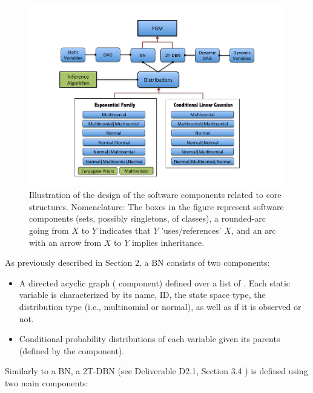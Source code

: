 \begin{figure}[htbp]
\begin{center}
\includegraphics[width=\linewidth]{./figures/ToolboxBasicStructures}
\caption{\label{Figure:ToolboxBasicStructure} Illustration of the design of the software components related to
  core structures. Nomenclature: The boxes in the
      figure represent software components (sets, possibly singletons, of classes), a rounded-arc going from $X$
      to $Y$ indicates that $Y$ 'uses/references' $X$, and an arc with an arrow from $X$ to $Y$ implies
      inheritance.}
\end{center}
\end{figure}

As previously described in Section 2, a BN consists of two components:

\begin{itemize}
  \item A directed acyclic graph ( component) defined over a list of . Each static variable is characterized by its name, ID, the state space type, the distribution type (i.e., multinomial or normal), as well as if it is observed or not.

  \item Conditional probability distributions of each variable given its parents (defined by the  component).
\end{itemize}

Similarly to a BN, a 2T-DBN (see Deliverable D2.1, Section 3.4 \cite{AMIDST-D21}) is defined using two main components:


